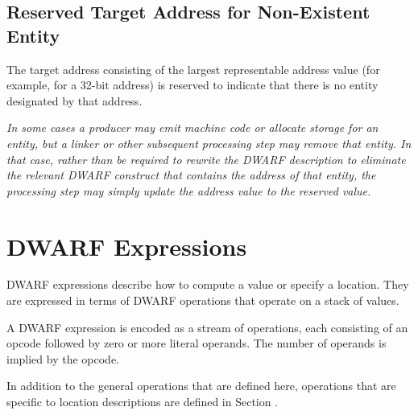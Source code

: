 \bb
{}
\subsection{Reserved Target Address for Non-Existent Entity}
\label{chap:reservedtargetaddress}
The target address consisting of the largest representable address
value (for example, \xffffffff{} for a 32-bit address) is reserved to
indicate that there is no entity designated by that address.

\textit{In some cases a producer may emit machine code or allocate
storage for an entity, but a linker or other subsequent processing
step may remove that entity. In that case, rather than be required
to rewrite the DWARF description to eliminate the relevant DWARF
construct that contains the address of that entity, the processing
step may simply update the address value to the reserved value.}
\eb

\section{DWARF Expressions}
\label{chap:dwarfexpressions}
DWARF expressions describe how to compute a value or 
specify a location. They are expressed in
terms of DWARF operations that operate on a stack of values.

A DWARF expression is encoded as a stream of operations, 
each consisting of an opcode followed by zero or more literal 
operands. The number of operands is implied by the opcode.  

In addition to the
general operations that are defined here, operations that are
specific to location descriptions are defined in 
Section .

